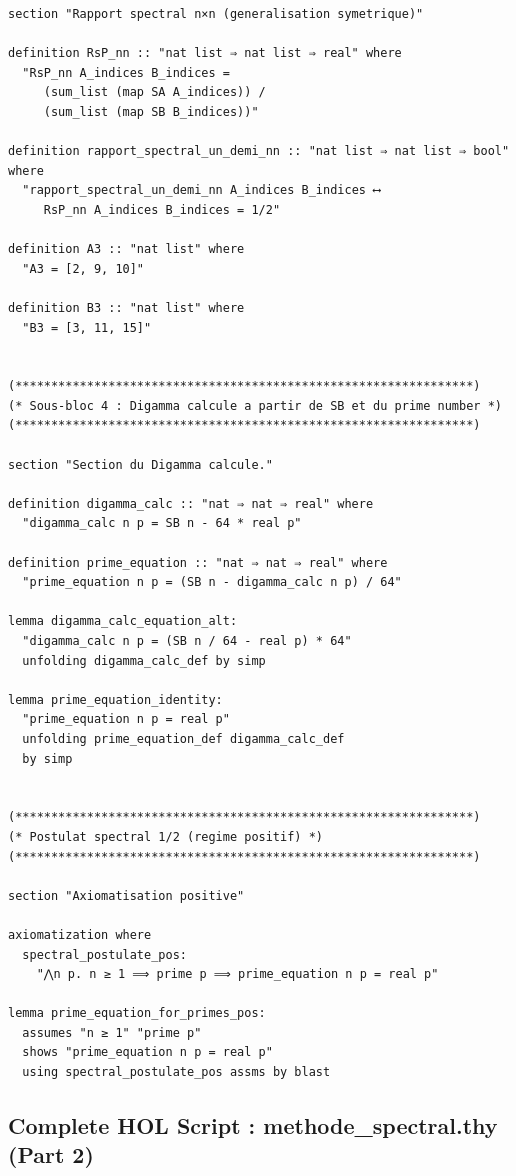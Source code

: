\documentclass[a4paper,11pt]{article}
\begin{document}
\begin{holcode}[title={\textcolor{white}{File: methode\_spectral.thy -- Part 1/4}}]
\begin{lstlisting}
section "Rapport spectral n×n (generalisation symetrique)"

definition RsP_nn :: "nat list ⇒ nat list ⇒ real" where
  "RsP_nn A_indices B_indices =
     (sum_list (map SA A_indices)) /
     (sum_list (map SB B_indices))"

definition rapport_spectral_un_demi_nn :: "nat list ⇒ nat list ⇒ bool" where
  "rapport_spectral_un_demi_nn A_indices B_indices ⟷
     RsP_nn A_indices B_indices = 1/2"

definition A3 :: "nat list" where
  "A3 = [2, 9, 10]"

definition B3 :: "nat list" where
  "B3 = [3, 11, 15]"


(****************************************************************)
(* Sous-bloc 4 : Digamma calcule a partir de SB et du prime number *)
(****************************************************************)

section "Section du Digamma calcule."

definition digamma_calc :: "nat ⇒ nat ⇒ real" where
  "digamma_calc n p = SB n - 64 * real p"

definition prime_equation :: "nat ⇒ nat ⇒ real" where
  "prime_equation n p = (SB n - digamma_calc n p) / 64"

lemma digamma_calc_equation_alt:
  "digamma_calc n p = (SB n / 64 - real p) * 64"
  unfolding digamma_calc_def by simp

lemma prime_equation_identity:
  "prime_equation n p = real p"
  unfolding prime_equation_def digamma_calc_def
  by simp


(****************************************************************)
(* Postulat spectral 1/2 (regime positif) *)
(****************************************************************)

section "Axiomatisation positive"

axiomatization where
  spectral_postulate_pos:
    "⋀n p. n ≥ 1 ⟹ prime p ⟹ prime_equation n p = real p"

lemma prime_equation_for_primes_pos:
  assumes "n ≥ 1" "prime p"
  shows "prime_equation n p = real p"
  using spectral_postulate_pos assms by blast
\end{lstlisting}
\end{holcode}

\newpage
\subsection{Complete HOL Script : methode\_spectral.thy (Part 2)}
\end{document}
